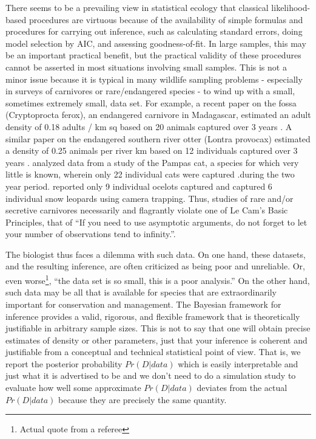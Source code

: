There seems to be a prevailing view in statistical ecology that classical likelihood-based procedures are virtuous because of the availability of simple formulas and procedures for carrying out inference, such as calculating standard errors, doing model selection by AIC, and assessing goodness-of-fit.  In large samples, this may be an important practical benefit, but the practical validity of these procedures cannot be asserted in most situations involving small samples.  This is not a minor issue because it is typical in many wildlife sampling problems - especially in surveys of carnivores or rare/endangered species - to wind up with a small, sometimes extremely small, data set. For example, a recent paper on the fossa (Cryptoprocta ferox), an endangered carnivore in Madagascar, estimated an adult density of 0.18 adults / km sq based on 20 animals captured over 3 years \citep{hawkins_racey:2005}. A similar paper on the endangered southern river otter (Lontra provocax) estimated a density of 0.25 animals per river km based on 12 individuals captured over 3 years \citep{sepulveda_etal:2007}. \citet{gardner_etal:2010} analyzed data from a study of the Pampas cat, a species for which very little is known, wherein only 22 individual cats were captured .during the two year period.  \citet{trolle_kery:2005} reported only 9 individual ocelots captured and \citet{jackson_etal:2006} captured 6 individual snow leopards using camera trapping. Thus, studies of rare and/or secretive carnivores necessarily and flagrantly violate one of Le Cam's Basic Principles, that of ``If you need to use asymptotic arguments, do not forget to let your number of observations tend to infinity.''\citep{lecam:1990}.

The biologist thus faces a dilemma with such data. On one hand, these datasets, and the resulting inference, are often criticized as being poor and unreliable. Or, even worse\footnote{Actual quote from a referee}, ``the data set is so small, this is a poor analysis.''  On the other hand, such data may be all that is available for species that are extraordinarily important for conservation and management.    The Bayesian framework for inference provides a valid, rigorous, and flexible framework that is theoretically justifiable in arbitrary sample sizes. This is not to say that one will obtain precise estimates of density or other parameters, just that your inference is coherent and justifiable from a conceptual and technical statistical point of view. That is, we report the posterior probability $Pr(D|data)$ which is easily interpretable and just what it is advertised to be and we don't need to do a simulation study to evaluate how well some approximate $Pr(D|data)$ deviates from the actual $Pr(D|data)$ because they are precisely the same quantity.



